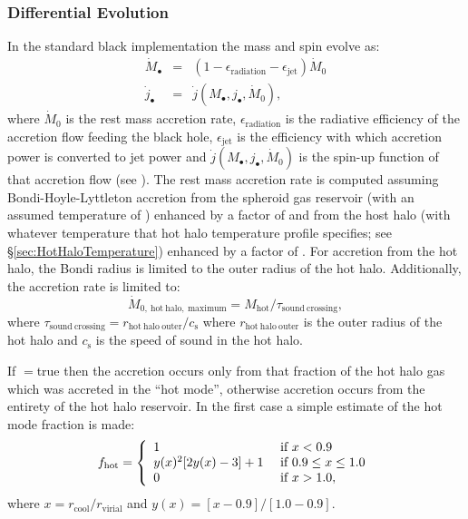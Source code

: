 \subsubsection{Differential Evolution}

In the standard black implementation the mass and spin evolve as:
\begin{eqnarray}
\dot{M}_\bullet &=& (1-\epsilon_\mathrm{radiation}-\epsilon_\mathrm{jet}) \dot{M}_0 \\
\dot{j}_\bullet &=& \dot{j}(M_\bullet,j_\bullet,\dot{M}_0),
\end{eqnarray}
where $\dot{M}_0$ is the rest mass accretion rate, $\epsilon_\mathrm{radiation}$ is the radiative efficiency of the accretion flow feeding the black hole, $\epsilon_\mathrm{jet}$ is the efficiency with which accretion power is converted to jet power and $\dot{j}(M_\bullet,j_\bullet,\dot{M}_0)$ is the spin-up function of that accretion flow (see ). The rest mass accretion rate is computed assuming Bondi-Hoyle-Lyttleton accretion from the spheroid gas reservoir (with an assumed temperature of {\normalfont \ttfamily [bondiHoyleAccretionTemperatureSpheroid]}) enhanced by a factor of {\normalfont \ttfamily [bondiHoyleAccretionEnhancementSpheroid]} and from the host halo (with whatever temperature that hot halo temperature profile specifies; see \S\ref{sec:HotHaloTemperature}) enhanced by a factor of {\normalfont \ttfamily [bondiHoyleAccretionEnhancementHotHalo]}. For accretion from the hot halo, the Bondi radius is limited to the outer radius of the hot halo. Additionally, the accretion rate is limited to:
\begin{equation}
 \dot{M}_\mathrm{0,~hot~halo,~maximum} = M_\mathrm{hot}/\tau_\mathrm{sound~crossing},
\end{equation}
where $\tau_\mathrm{sound~crossing}=r_\mathrm{hot~halo~outer}/c_\mathrm{s}$ where $r_\mathrm{hot~halo~outer}$ is the outer radius of the hot halo and $c_\mathrm{s}$ is the speed of sound in the hot halo.

If {\normalfont \ttfamily [bondiHoyleAccretionHotModeOnly]}$=${\normalfont \ttfamily true} then the accretion occurs only from that fraction of the hot halo gas which was accreted in the ``hot mode'', otherwise accretion 
occurs from the entirety of the hot halo reservoir. In the first case a simple estimate of the hot mode fraction is made:
\begin{equation}
f_\mathrm{hot} = \left\{ \begin{array}{ll} 1 & \hbox{ if } x < 0.9 \\ y(x)^2[2 y(x) - 3]+1  & \hbox{ if } 0.9 \le x \le 1.0 \\ 0 & \hbox{ if } x > 1.0, \end{array} \right.
\end{equation}
where $x = r_\mathrm{cool}/r_\mathrm{virial}$ and $y(x)=[x-0.9]/[1.0-0.9]$.

